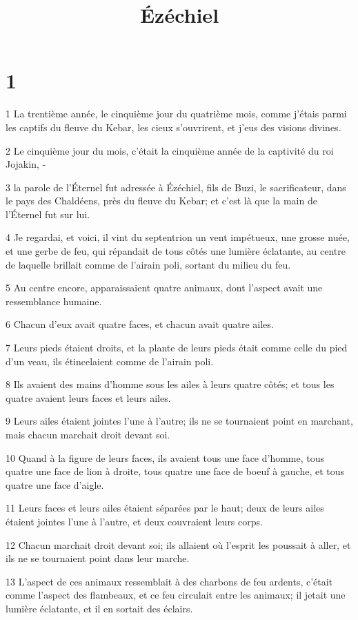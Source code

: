 

\title{Ézéchiel}


\chapter{1}

\par 1 La trentième année, le cinquième jour du quatrième mois, comme j'étais parmi les captifs du fleuve du Kebar, les cieux s'ouvrirent, et j'eus des visions divines.
\par 2 Le cinquième jour du mois, c'était la cinquième année de la captivité du roi Jojakin, -
\par 3 la parole de l'Éternel fut adressée à Ézéchiel, fils de Buzi, le sacrificateur, dans le pays des Chaldéens, près du fleuve du Kebar; et c'est là que la main de l'Éternel fut sur lui.
\par 4 Je regardai, et voici, il vint du septentrion un vent impétueux, une grosse nuée, et une gerbe de feu, qui répandait de tous côtés une lumière éclatante, au centre de laquelle brillait comme de l'airain poli, sortant du milieu du feu.
\par 5 Au centre encore, apparaissaient quatre animaux, dont l'aspect avait une ressemblance humaine.
\par 6 Chacun d'eux avait quatre faces, et chacun avait quatre ailes.
\par 7 Leurs pieds étaient droits, et la plante de leurs pieds était comme celle du pied d'un veau, ils étincelaient comme de l'airain poli.
\par 8 Ils avaient des mains d'homme sous les ailes à leurs quatre côtés; et tous les quatre avaient leurs faces et leurs ailes.
\par 9 Leurs ailes étaient jointes l'une à l'autre; ils ne se tournaient point en marchant, mais chacun marchait droit devant soi.
\par 10 Quand à la figure de leurs faces, ils avaient tous une face d'homme, tous quatre une face de lion à droite, tous quatre une face de boeuf à gauche, et tous quatre une face d'aigle.
\par 11 Leurs faces et leurs ailes étaient séparées par le haut; deux de leurs ailes étaient jointes l'une à l'autre, et deux couvraient leurs corps.
\par 12 Chacun marchait droit devant soi; ils allaient où l'esprit les poussait à aller, et ils ne se tournaient point dans leur marche.
\par 13 L'aspect de ces animaux ressemblait à des charbons de feu ardents, c'était comme l'aspect des flambeaux, et ce feu circulait entre les animaux; il jetait une lumière éclatante, et il en sortait des éclairs.

